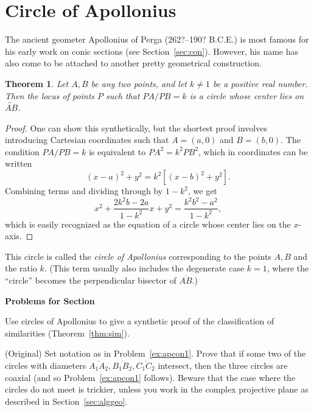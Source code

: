 \documentclass[12pt]{book}
\newcounter{exc}
\numberwithin{exc}{section}
\numberwithin{figure}{section}
\newenvironment{exer}{\vspace{0.1in}
\noindent \textbf{Problems for Section~\thesection} \vspace{0.1in}
\begin{list}{\arabic{exc}.}{\usecounter{exc}}}{\end{list}}
\newtheorem{theorem}{Theorem}[section]
\numberwithin{equation}{theorem}
\def\ii{\item}
\def\line#1{\overleftrightarrow{#1}}
\def\seg#1{\overline{#1}}
\begin{document}
\section{Circle of Apollonius} \label{sec:circ-app}

The ancient geometer 
Apollonius of Perga (262?--190? B.C.E.)
is most famous for his early 
work on conic sections (see Section~\ref{sec:con}). 
However, his name has also come to be attached to 
another pretty geometrical construction.

\begin{theorem} \label{thm:ap}
Let $A,B$ be any two points, and let $k \neq 1$ be 
a positive real number. Then the 
locus of points $P$ such that $PA/PB = k$ is a circle whose center 
lies on $\line{AB}$.
\end{theorem}
\begin{proof}
One can show this synthetically, but the shortest proof involves
introducing Cartesian coordinates such that $A = (a, 0)$ and 
$B = (b, 0)$. The condition $PA/PB = k$ is equivalent to $PA^{2} = k^{2}
PB^{2}$, which in coordinates can be written
\[
(x-a)^{2} + y^{2} = k^{2}[(x-b)^{2} + y^{2}].
\]
Combining terms and dividing through by $1-k^{2}$, we get
\[
x^{2} + \frac{2k^{2}b-2a}{1-k^{2}}x + y^{2} = 
\frac{k^{2}b^{2}-a^{2}}{1-k^{2}},
\]
which is easily recognized as the equation of a circle whose center 
lies on the $x$-axis.
\end{proof}

This circle is called the \emph{circle of Apollonius} 
 
corresponding 
to the points $A,B$ and the ratio $k$. (This term usually also 
includes the degenerate case $k=1$, where the ``circle'' becomes
the perpendicular bisector of $\seg{AB}$.)

\begin{exer}
\ii \label{ex:simsynth}
Use circles of Apollonius to give a synthetic proof of the 
classification of similarities (Theorem~\ref{thm:sim}).
\ii (Original) \label{ex:apcon}
Set notation as in Problem~\ref{ex:apcon1}. Prove that if some two of the
circles with diameters $\seg{A_1A_2}, \seg{B_1B_2}, \seg{C_1C_2}$ 
intersect, then the three circles are coaxial (and so Problem~\ref{ex:apcon1}
follows). Beware that the case where the circles do not meet is trickier, 
unless you work in the complex projective plane as described in 
Section~\ref{sec:alggeo}.
\end{exer}
\end{document}
